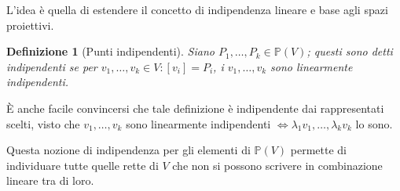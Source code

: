 \documentclass[11pt]{scrartcl}
\theoremstyle{style1}
\newtheorem{definizione}{Definizione}[section]
\numberwithin{equation}{subsection}
\begin{document}
L'idea \`e quella di estendere il concetto di indipendenza lineare e base agli spazi proiettivi.

\begin{definizione}
	[Punti indipendenti]
	Siano $P_1, \ldots, P_k \in \mathbb{P}(V)$; questi sono detti \textit{indipendenti} se per $v_1,\ldots,v_k \in V : [v_i] = P_i$, i $v_1,\ldots,v_k$ sono linearmente indipendenti.
\end{definizione}
\noindent \`E anche facile convincersi che tale definizione \`e indipendente dai rappresentati scelti, visto che $v_1,\ldots,v_k$ sono linearmente indipendenti $\iff \lambda _1 v_1,\ldots, \lambda _kv_k$ lo sono.

Questa nozione di indipendenza per gli elementi di $\mathbb{P}(V)$ permette di individuare tutte quelle rette di $V$ che non si possono scrivere in combinazione lineare tra di loro.
\end{document}
